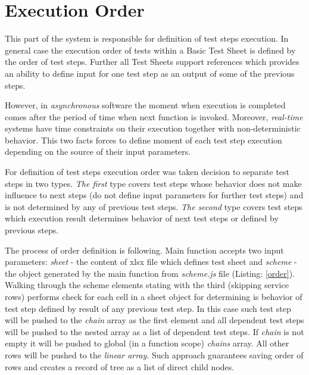 \section{Execution Order}
This part of the system is responsible for definition of test steps execution. In general case the execution order of tests within a Basic Test Sheet is defined by the order of test steps. 
Further all Test Sheets support references which provides an ability to define input for one test step as an output of some of the previous steps.


However, in \textit{asynchronous} software the moment when execution is completed comes after the period of time when next function is invoked. Moreover, \textit{real-time} systems have time constraints on their execution together with non-deterministic behavior. This two facts forces to define moment of each test step execution depending on the source of their input parameters. 


For definition of test steps execution order was taken decision to separate test steps in two types. \textit{The first} type covers test steps whose behavior does not make influence to next steps (do not define input parameters for further test steps) and is not determined by any of previous test steps. \textit{The second} type covers test steps which execution result determines behavior of next test steps or defined by previous steps.

%
The process of order definition is following. Main function accepts two input parameters: \textit{sheet} - the content of xlsx file which defines test sheet and \textit{scheme} - the object generated by the main function from \textit{scheme.js} file (Listing: \ref{order}). Walking through the scheme elements stating with the third (skipping service rows) performs check for each cell in a sheet object for determining is behavior of test step defined by result of any previous test step. In this case such test step will be pushed to the \textit{chain} array as the first element and all dependent test steps will be pushed to the nested array as a list of dependent test steps. If \textit{chain} is not empty it will be pushed to global (in a function scope) \textit{chains}  array. All other rows will be pushed to the \textit{linear array}. Such approach guarantees saving order of rows and creates a record of tree as a list of direct child nodes.


